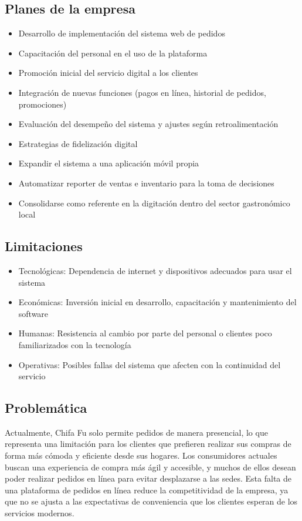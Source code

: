 \documentclass{article}
\begin{document}
\begin{doublespace}
    \subsection{Planes de la empresa}
    \begin{itemize}
        \item Desarrollo de implementación del sistema web de pedidos
        \item Capacitación del personal en el uso de la plataforma
        \item Promoción inicial del servicio digital a los clientes
        \item Integración de nuevas funciones (pagos en línea, historial de pedidos, promociones)
        \item Evaluación del desempeño del sistema y ajustes según retroalimentación
        \item Estrategias de fidelización digital
        \item Expandir el sistema a una aplicación móvil propia
        \item Automatizar reporter de ventas e inventario para la toma de decisiones
        \item Consolidarse como referente en la digitación dentro del sector gastronómico local
    \end{itemize}

    \subsection{Limitaciones}
    \begin{itemize}
        \item Tecnológicas: Dependencia de internet y dispositivos adecuados para usar el sistema
        \item Económicas: Inversión inicial en desarrollo, capacitación y mantenimiento del software
        \item Humanas: Resistencia al cambio por parte del personal o clientes poco familiarizados con la tecnología
        \item Operativas: Posibles fallas del sistema que afecten con la continuidad del servicio
    \end{itemize}

    \subsection{Problemática}
    \noindent Actualmente, Chifa Fu solo permite pedidos de manera presencial, lo que representa una limitación para los clientes que prefieren realizar sus compras de forma más cómoda y eficiente desde sus hogares. Los consumidores actuales buscan una experiencia de compra más ágil y accesible, y muchos de ellos desean poder realizar pedidos en línea para evitar desplazarse a las sedes. Esta falta de una plataforma de pedidos en línea reduce la competitividad de la empresa, ya que no se ajusta a las expectativas de conveniencia que los clientes esperan de los servicios modernos.



\end{doublespace}
\end{document}
